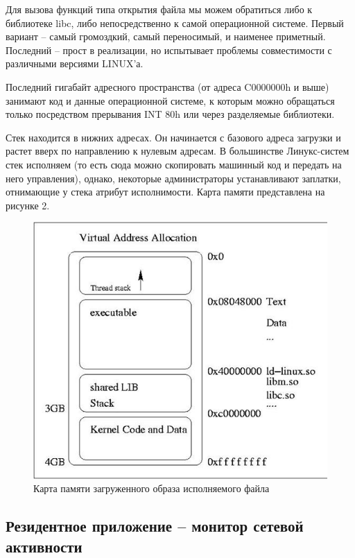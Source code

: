 Для вызова функций типа открытия файла мы можем обратиться либо к библиотеке libc, либо непосредственно к самой операционной системе. Первый вариант -- самый громоздкий, самый переносимый, и наименее приметный. Последний -- прост в реализации, но испытывает проблемы совместимости с различными версиями LINUX'а.

Последний гигабайт адресного пространства (от адреса C0000000h и выше) занимают код и данные операционной системе, к которым можно обращаться только посредством прерывания INT 80h или через разделяемые библиотеки.

Стек находится в нижних адресах. Он начинается с базового адреса загрузки и растет вверх по направлению к нулевым адресам. В большинстве Линукс-систем стек исполняем (то есть сюда можно скопировать машинный код и передать на него управления), однако, некоторые администраторы устанавливают заплатки, отнимающие у стека атрибут исполнимости. Карта памяти представлена на рисунке 2.


\begin{figure}[H]
 \centering
 \includegraphics[scale=1]{res/lin_002}
 \caption{Карта памяти загруженного образа исполняемого файла}
\end{figure}

\subsection{Резидентное приложение -- монитор сетевой активности}

